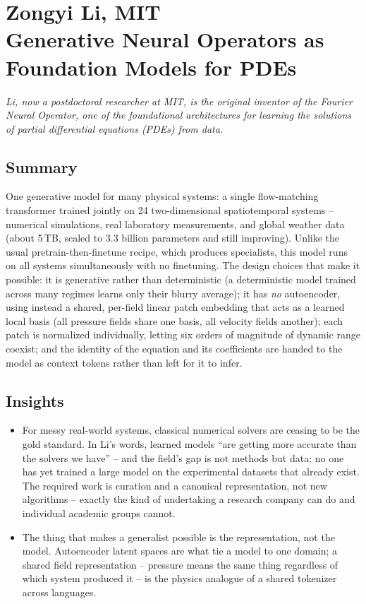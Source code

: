 \documentclass[11pt]{article}
\begin{document}
\section{Zongyi Li, MIT\\
{\large Generative Neural Operators as Foundation Models for PDEs}}

\emph{Li, now a postdoctoral researcher at MIT, is the original inventor of the Fourier Neural Operator, one of the foundational architectures for learning the solutions of partial differential equations (PDEs) from data.}

\subsection*{Summary}
One generative model for many physical systems: a single flow-matching transformer trained jointly on 24 two-dimensional spatiotemporal systems -- numerical simulations, real laboratory measurements, and global weather data (about 5\,TB, scaled to 3.3 billion parameters and still improving). Unlike the usual pretrain-then-finetune recipe, which produces specialists, this model runs on all systems simultaneously with no finetuning. The design choices that make it possible: it is generative rather than deterministic (a deterministic model trained across many regimes learns only their blurry average); it has \emph{no} autoencoder, using instead a shared, per-field linear patch embedding that acts as a learned local basis (all pressure fields share one basis, all velocity fields another); each patch is normalized individually, letting six orders of magnitude of dynamic range coexist; and the identity of the equation and its coefficients are handed to the model as context tokens rather than left for it to infer.

\subsection*{Insights}
\begin{itemize}
    \item For messy real-world systems, classical numerical solvers are ceasing to be the gold standard. In Li's words, learned models ``are getting more accurate than the solvers we have'' -- and the field's gap is not methods but data: no one has yet trained a large model on the experimental datasets that already exist. The required work is curation and a canonical representation, not new algorithms -- exactly the kind of undertaking a research company can do and individual academic groups cannot.
    \item The thing that makes a generalist possible is the representation, not the model. Autoencoder latent spaces are what tie a model to one domain; a shared field representation -- pressure means the same thing regardless of which system produced it -- is the physics analogue of a shared tokenizer across languages.
\end{itemize}
\end{document}
